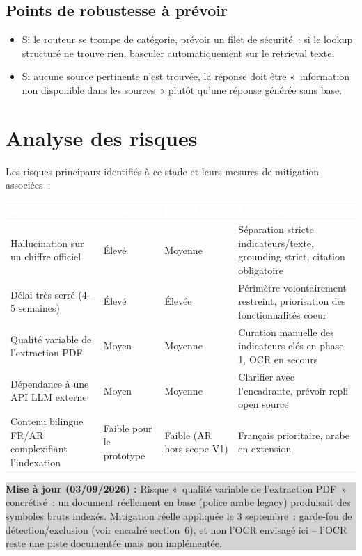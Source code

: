 \documentclass[11pt,a4paper]{article}
\newcommand{\tblhead}[1]{\textcolor{white}{\textbf{#1}}}
\newcommand{\majcadrage}[1]{%
\par\vspace{0.35cm}
\noindent\colorbox{lightgrey}{%
\begin{minipage}{\dimexpr\linewidth-2\fboxsep}
\vspace{0.15cm}
\textbf{\color{gold}Mise \`a jour (03/09/2026) :} #1
\vspace{0.15cm}
\end{minipage}%
}
\vspace{0.35cm}
}
\begin{document}
\subsection{Points de robustesse \`a pr\'evoir}
\begin{itemize}
\item Si le routeur se trompe de cat\'egorie, pr\'evoir un filet de s\'ecurit\'e~: si le lookup structur\'e ne trouve rien, basculer automatiquement sur le retrieval texte.
\item Si aucune source pertinente n'est trouv\'ee, la r\'eponse doit \^etre «~information non disponible dans les sources~» plut\^ot qu'une r\'eponse g\'en\'er\'ee sans base.
\end{itemize}

\section{Analyse des risques}
Les risques principaux identifi\'es \`a ce stade et leurs mesures de mitigation associ\'ees~:

\begin{longtable}{@{}p{4cm}p{2cm}p{2.2cm}p{6cm}@{}}
\rowcolor{navy}
\tblhead{Risque} & \tblhead{Impact} & \tblhead{Probabilit\'e} & \tblhead{Mitigation} \\
\midrule
\endhead
Hallucination sur un chiffre officiel & \'Elev\'e & Moyenne & S\'eparation stricte indicateurs/texte, grounding strict, citation obligatoire \\
D\'elai tr\`es serr\'e (4-5 semaines) & \'Elev\'e & \'Elev\'ee & P\'erim\`etre volontairement restreint, priorisation des fonctionnalit\'es coeur \\
Qualit\'e variable de l'extraction PDF & Moyen & Moyenne & Curation manuelle des indicateurs cl\'es en phase 1, OCR en secours \\
D\'ependance \`a une API LLM externe & Moyen & Moyenne & Clarifier avec l'encadrante, pr\'evoir repli open source \\
Contenu bilingue FR/AR complexifiant l'indexation & Faible pour le prototype & Faible (AR hors scope V1) & Fran\c{c}ais prioritaire, arabe en extension \\
\end{longtable}

\majcadrage{Risque «~qualit\'e variable de l'extraction PDF~» concr\'etis\'e~: un document r\'eellement en base (police arabe legacy) produisait des symboles bruts index\'es. Mitigation r\'eelle appliqu\'ee le 3 septembre~: garde-fou de d\'etection/exclusion (voir encadr\'e section~6), et non l'OCR envisag\'e ici -- l'OCR reste une piste document\'ee mais non impl\'ement\'ee.}
\end{document}
